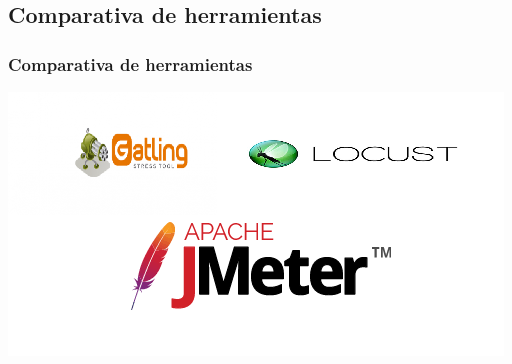 \documentclass{beamer}
\theoremstyle{plain}
\theoremstyle{definition}
\theoremstyle{plain}
\theoremstyle{definition}
\theoremstyle{remark}
\theoremstyle{definition}
\begin{document}
\subsection{Comparativa de herramientas}
\begin{frame}
	\frametitle{Comparativa de herramientas}
	\centering
	\includegraphics[scale=0.8]{imagenes/comparativaHerramientasPrueba.png}
	
\end{frame}
\end{document}
